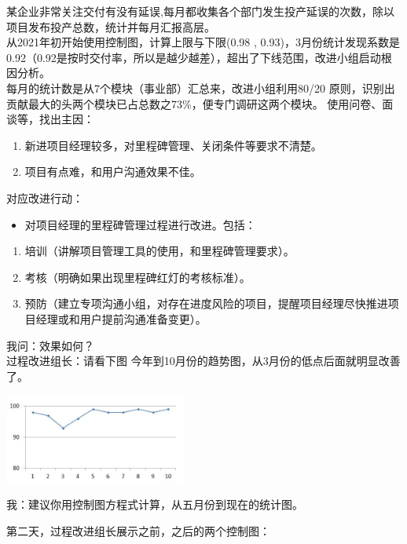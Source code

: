 某企业非常关注交付有没有延误,每月都收集各个部门发生投产延误的次数，除以项目发布投产总数，统计并每月汇报高层。\\
从2021年初开始使用控制图，计算上限与下限(0.98 ,
0.93)，3月份统计发现系数是0.92（0.92是按时交付率，所以是越少越差），超出了下线范围，改进小组启动根因分析。\\
每月的统计数是从7个模块（事业部）汇总来，改进小组利用80/20
原则，识别出贡献最大的头两个模块已占总数之73\%，便专门调研这两个模块。
使用问卷、面谈等，找出主因：

\begin{enumerate}
\tightlist
\item
  新进项目经理较多，对里程碑管理、关闭条件等要求不清楚。
\item
  项目有点难，和用户沟通效果不佳。
\end{enumerate}

对应改进行动：

\begin{itemize}
\tightlist
\item
  对项目经理的里程碑管理过程进行改进。包括：
\end{itemize}

\begin{enumerate}
\tightlist
\item
  培训（讲解项目管理工具的使用，和里程碑管理要求）。
\item
  考核（明确如果出现里程碑红灯的考核标准）。
\item
  预防（建立专项沟通小组，对存在进度风险的项目，提醒项目经理尽快推进项目经理或和用户提前沟通准备变更）。
\end{enumerate}

我问：效果如何？\\
过程改进组长：请看下图
今年到10月份的趋势图，从3月份的低点后面就明显改善了。


\includegraphics[width=6cm]{M3_CC_figure1.jpg}

我：建议你用控制图方程式计算，从五月份到现在的统计图。

第二天，过程改进组长展示之前，之后的两个控制图：

\begin{description}
\item[]
\end{description}


